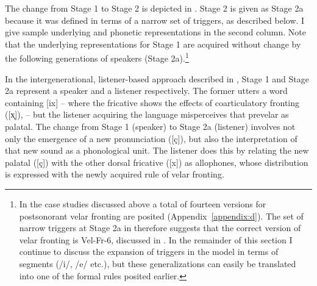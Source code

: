   The change from Stage 1 to Stage 2 is depicted in . Stage 2 is given as Stage 2a because it was defined in terms of a narrow set of triggers, as described below. I give sample underlying and phonetic representations in the second column. Note that the underlying representations for Stage 1 are acquired without change by the following generations of speakers (Stage 2a).\footnote{{In the case studies discussed above a total of fourteen versions for postsonorant velar fronting are posited (Appendix~\ref{appendix:d}). The set of narrow triggers at Stage 2a in  therefore suggests that the correct version of velar fronting is Vel-Fr-6, discussed in . In the remainder of this section I continue to discuss the expansion of triggers in the  model in terms of segments (/i/, /e/ etc.), but these generalizations can easily be translated into one of the formal rules posited earlier.}}

\begin{table}
\caption{Change from Stage 1 to Stage 2a\label{tab:16:2}}
\end{table}

In the intergenerational, listener-based approach described in , Stage 1 and Stage 2a represent a speaker and a listener respectively. The former utters a word containing [ix] -- where the fricative shows the effects of coarticulatory fronting ([x̟]), -- but the listener acquiring the language misperceives that prevelar as palatal. The change from Stage 1 (speaker) to Stage 2a (listener) involves not only the emergence of a new pronunciation ([ç]), but also the interpretation of that new sound as a phonological unit. The listener does this by relating the new palatal ([ç]) with the other dorsal fricative ([x]) as allophones, whose distribution is expressed with the newly acquired rule of velar fronting.


